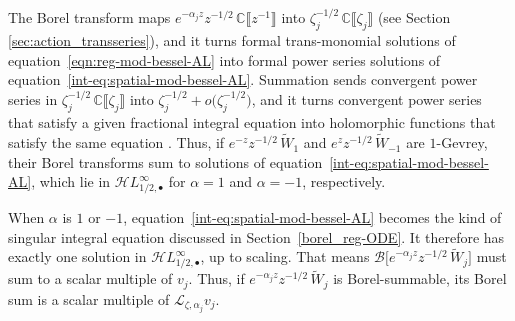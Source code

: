 \documentclass{article}
\newcommand{\singexp}[2]{\mathcal{H}L^\infty_{#1, #2}}
\newcommand{\singexpalg}[1]{\singexp{#1}{\bullet}}
\theoremstyle{definition}
\newcommand{\C}{\mathbb{C}}
\newcommand{\laplace}{\mathcal{L}}
\newcommand{\borel}{\mathcal{B}}
\theoremstyle{plain}
\begin{document}
The Borel transform maps $e^{-\alpha_j z} z^{-1/2}\,\C\llbracket z^{-1} \rrbracket$ into $\zeta_j^{-1/2}\,\C\llbracket \zeta_j \rrbracket$ (see Section \ref{sec:action_transseries}), and it turns formal trans-monomial solutions of equation~\eqref{eqn:reg-mod-bessel-AL} into formal power series solutions of equation~\eqref{int-eq:spatial-mod-bessel-AL}. Summation sends convergent power series in $\zeta_j^{-1/2}\,\C\llbracket \zeta_j \rrbracket$ into $\zeta_j^{-1/2}+ o\big(\zeta_j^{-1/2}\big)$, and it turns convergent power series that satisfy a given fractional integral equation into holomorphic functions that satisfy the same equation \cite[Lemma 2]{reg-sing-volterra}. Thus, if $e^{-z} z^{-1/2}\,\tilde{W}_1$ and $e^z z^{-1/2}\,\tilde{W}_{-1}$ are $1$-Gevrey, their Borel transforms sum to solutions of equation~\eqref{int-eq:spatial-mod-bessel-AL}, which lie in $\singexpalg{1/2}$ for $\alpha = 1$ and $\alpha = -1$, respectively.

When $\alpha$ is $1$ or $-1$, equation~\eqref{int-eq:spatial-mod-bessel-AL} becomes the kind of singular integral equation discussed in Section~\ref{borel_reg-ODE}. It therefore has exactly one solution in $\singexpalg{1/2}$, up to scaling. That means $\borel\big[ e^{-\alpha_j z} z^{-1/2}\,\tilde{W}_j \big]$ must sum to a scalar multiple of $v_j$. Thus, if $e^{-\alpha_j z} z^{-1/2}\,\tilde{W}_j$ is Borel-summable, its Borel sum is a scalar multiple of $\laplace_{\zeta, \alpha_j} v_j$.
\end{document}
